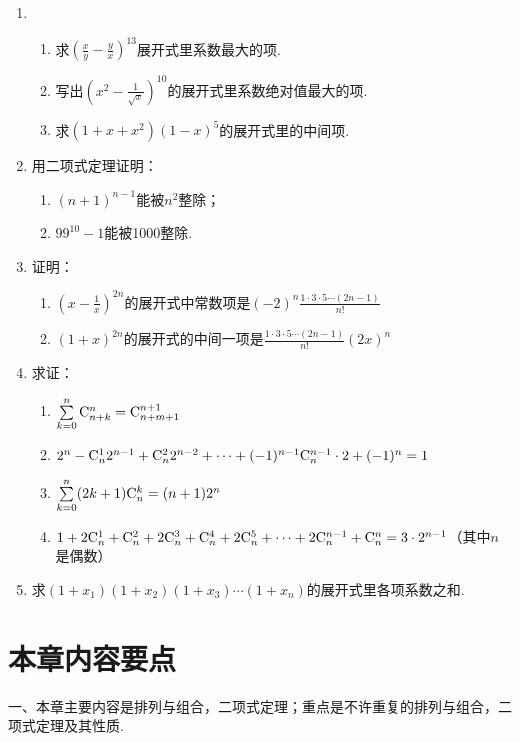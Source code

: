 \begin{enumerate}
\item \begin{enumerate}[(1)]
    \item 求$\left(\frac{x}{y}-\frac{y}{x}\right)^{13}$展开式里系数最大的项.
    \item 写出$\left(x^2-\frac{1}{\sqrt{x}}\right)^{10}$的展开式里系数绝对值最大的项.
    \item 求$(1+x+x^2)(1-x)^5$的展开式里的中间项.
\end{enumerate}

\item 用二项式定理证明：
\begin{enumerate}[(1)]
    \item $(n+1)^{n-1}$能被$n^2$整除；
    \item $99^{10}-1$能被1000整除.
\end{enumerate}

\item 证明：
\begin{enumerate}[(1)]
    \item $\left(x-\frac{1}{x}\right)^{2n}$的展开式中常数项是$(-2)^n\frac{1\cdot 3\cdot 5\cdots (2n-1)}{n!}$
    \item $(1+x)^{2n}$的展开式的中间一项是$\frac{1\cdot 3\cdot 5\cdots (2n-1)}{n!}(2x)^n$
\end{enumerate}

\item 求证：
\begin{enumerate}[(1)]
    \item $\sum\limits^n_{k=0}{\rm C}^{n}_{n+k}={\rm C}^{n+1}_{n+m+1}$
    \item $2^n-{\rm C}^{1}_{n}2^{n-1}+{\rm C}^{2}_{n}2^{n-2}+\cdots+(-1)^{n-1}{\rm C}^{n-1}_{n}\cdot 2+(-1)^n=1$
    \item $\sum\limits^n_{k=0}(2k+1){\rm C}^{k}_{n}=(n+1)2^n$
    \item $1+2{\rm C}^{1}_{n}+{\rm C}^{2}_{n}+2{\rm C}^{3}_{n}+{\rm C}^{4}_{n}+2{\rm C}^{5}_{n}+\cdots +2{\rm C}^{n-1}_{n}+{\rm C}^{n}_{n}=3\cdot 2^{n-1}$（其中$n$是偶数）
\end{enumerate}
\item 求$(1+x_1)(1+x_2)(1+x_3)\cdots(1+x_n)$的展开式里各项系数之和.
\end{enumerate}


\section*{本章内容要点}
一、本章主要内容是排列与组合，二项式定理；重点是不许重复的排列与组合，二项式定理及其性质.

